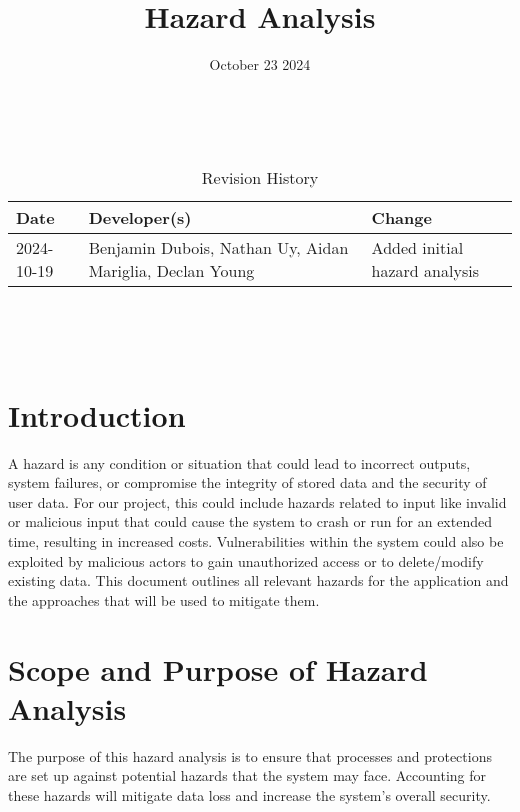 \documentclass{article}
\title{Hazard Analysis\\\progname}
\author{\authname}
\date{October 23 2024}
\begin{document}
\maketitle
\thispagestyle{empty}

~\newpage


\begin{table}[hp]
\caption{Revision History} \label{TblRevisionHistory}
\begin{tabularx}{\textwidth}{llX}
\toprule
\textbf{Date} & \textbf{Developer(s)} & \textbf{Change}\\
\midrule
2024-10-19 & Benjamin Dubois, Nathan Uy, Aidan Mariglia, Declan Young & Added initial hazard analysis\\
\bottomrule
\end{tabularx}
\end{table}

~\newpage

\tableofcontents

\listoftables

\listoffigures

~\newpage


\section{Introduction}

A hazard is any condition or situation that could lead to incorrect outputs, system failures, or compromise the integrity of stored data and the security of user data. For our project, this could include hazards related to input like invalid or malicious input that could cause the system to crash or run for an extended time, resulting in increased costs. Vulnerabilities within the system could also be exploited by malicious actors to gain unauthorized access or to delete/modify existing data. This document outlines all relevant hazards for the application and the approaches that will be used to mitigate them.

\section{Scope and Purpose of Hazard Analysis}

The purpose of this hazard analysis is to ensure that processes and protections are set up against potential hazards that the system may face. Accounting for these hazards will mitigate data loss and increase the system's overall security. 
\end{document}
